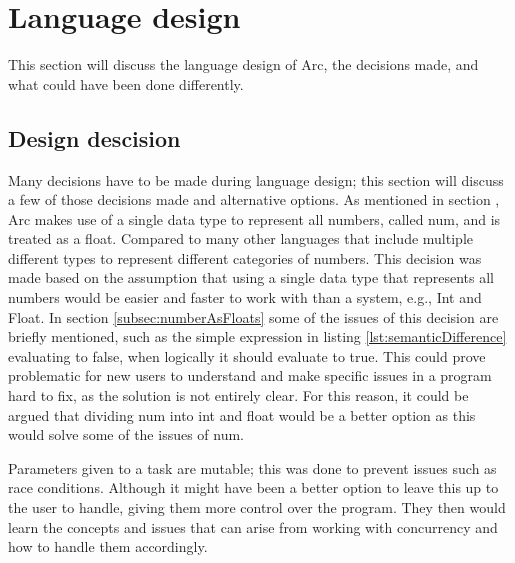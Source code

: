 \section{Language design}

This section will discuss the language design of Arc, the decisions made, and what could have been done differently.

\subsection{Design descision} 
Many decisions have to be made during language design; this section will discuss a few of those decisions made and alternative options.
As mentioned in section , Arc makes use of a single data type to represent all numbers, called num, and is treated as a float. Compared to many other languages that include multiple different types to represent different categories of numbers. This decision was made based on the assumption that using a single data type that represents all numbers would be easier and faster to work with than a system, e.g., Int and Float. In section \ref{subsec:numberAsFloats} some of the issues of this decision are briefly mentioned, such as the simple expression in listing \ref{lst:semanticDifference} evaluating to false, when logically it should evaluate to true. This could prove problematic for new users to understand and make specific issues in a program hard to fix, as the solution is not entirely clear. For this reason, it could be argued that dividing num into int and float would be a better option as this would solve some of the issues of num.


Parameters given to a task are mutable; this was done to prevent issues such as race conditions. Although it might have been a better option to leave this up to the user to handle, giving them more control over the program. They then would learn the concepts and issues that can arise from working with concurrency and how to handle them accordingly.

